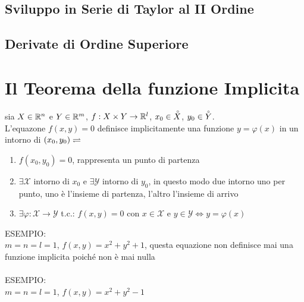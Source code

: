 \subsection{Sviluppo in Serie di Taylor al II Ordine}

\subsection{Derivate di Ordine Superiore}

\section{Il Teorema della funzione Implicita}
sia $X\in \mathbb{R}^n$ e $Y\in \mathbb{R}^m$, $f:X\times Y\to \mathbb{\mathbb{R}}^l$, $x_0\in \accentset{\circ}{X}$, $y_0\in \accentset{\circ}{Y}$.\\
L'equazone $f(x,y)=0$ definisce implicitamente una funzione $y=\varphi(x)$ in un intorno di $(x_0,y_0) \rightleftharpoons$
\begin{enumerate}
	\item $f(x_0,y_0)=0$, rappresenta un punto di partenza 
	\item $\exists \mathcal{X}$ intorno di $x_0$ e $\exists \mathcal{Y}$ intorno di $y_0$, in questo modo due intorno uno per punto, uno è l'insieme di partenza, l'altro l'insieme di arrivo
	\item $\exists\varphi:\mathcal{X}\rightarrow\mathcal{Y}$ t.c.: $f(x,y)=0$ con $x\in\mathcal{X}$ e $y\in\mathcal{Y} \iff y=\varphi(x)$
\end{enumerate}
ESEMPIO:\\
$m=n=l=1$, $f(x,y)=x^2+y^2+1$, questa equazione non definisce mai una funzione implicita poiché non è mai nulla\\
\\
ESEMPIO:\\
$m=n=l=1$, $f(x,y)=x^2+y^2-1$\\
	\\
